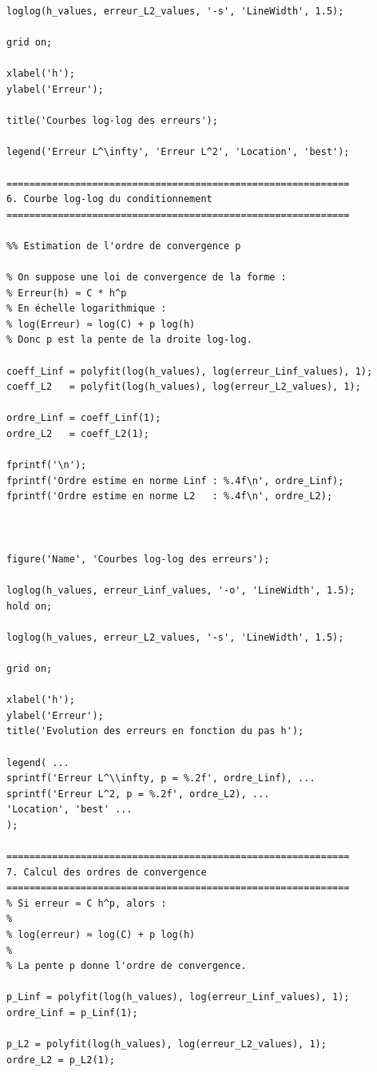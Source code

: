 \documentclass[12pt,a4paper]{article}
\begin{document}
\begin{lstlisting}[style=matlabstyle, caption={Code MATLAB utilisé pour la résolution numérique du problème de Poisson.}, label={code:matlab_poisson}]
loglog(h_values, erreur_L2_values, '-s', 'LineWidth', 1.5);

grid on;

xlabel('h');
ylabel('Erreur');

title('Courbes log-log des erreurs');

legend('Erreur L^\infty', 'Erreur L^2', 'Location', 'best');

============================================================
6. Courbe log-log du conditionnement
============================================================

%% Estimation de l'ordre de convergence p

% On suppose une loi de convergence de la forme :
% Erreur(h) ≈ C * h^p
% En échelle logarithmique :
% log(Erreur) ≈ log(C) + p log(h)
% Donc p est la pente de la droite log-log.

coeff_Linf = polyfit(log(h_values), log(erreur_Linf_values), 1);
coeff_L2   = polyfit(log(h_values), log(erreur_L2_values), 1);

ordre_Linf = coeff_Linf(1);
ordre_L2   = coeff_L2(1);

fprintf('\n');
fprintf('Ordre estime en norme Linf : %.4f\n', ordre_Linf);
fprintf('Ordre estime en norme L2   : %.4f\n', ordre_L2);



figure('Name', 'Courbes log-log des erreurs');

loglog(h_values, erreur_Linf_values, '-o', 'LineWidth', 1.5);
hold on;

loglog(h_values, erreur_L2_values, '-s', 'LineWidth', 1.5);

grid on;

xlabel('h');
ylabel('Erreur');
title('Evolution des erreurs en fonction du pas h');

legend( ...
sprintf('Erreur L^\\infty, p = %.2f', ordre_Linf), ...
sprintf('Erreur L^2, p = %.2f', ordre_L2), ...
'Location', 'best' ...
);

============================================================
7. Calcul des ordres de convergence
============================================================
% Si erreur ≈ C h^p, alors :
%
% log(erreur) ≈ log(C) + p log(h)
%
% La pente p donne l'ordre de convergence.

p_Linf = polyfit(log(h_values), log(erreur_Linf_values), 1);
ordre_Linf = p_Linf(1);

p_L2 = polyfit(log(h_values), log(erreur_L2_values), 1);
ordre_L2 = p_L2(1);


\end{lstlisting}
\end{document}
